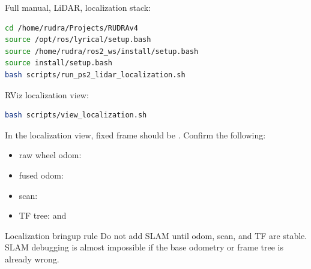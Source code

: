 Full manual, LiDAR, localization stack:

\begin{lstlisting}[language=bash]
cd /home/rudra/Projects/RUDRAv4
source /opt/ros/lyrical/setup.bash
source /home/rudra/ros2_ws/install/setup.bash
source install/setup.bash
bash scripts/run_ps2_lidar_localization.sh
\end{lstlisting}

RViz localization view:

\begin{lstlisting}[language=bash]
bash scripts/view_localization.sh
\end{lstlisting}

In the localization view, fixed frame should be . Confirm the following:

\begin{itemize}
  \item raw wheel odom: 
  \item fused odom: 
  \item scan: 
  \item TF tree:  and 
\end{itemize}

\begin{operatorbox}{Localization bringup rule}
Do not add SLAM until odom, scan, and TF are stable. SLAM debugging is almost impossible if the base odometry or frame tree is already wrong.
\end{operatorbox}

